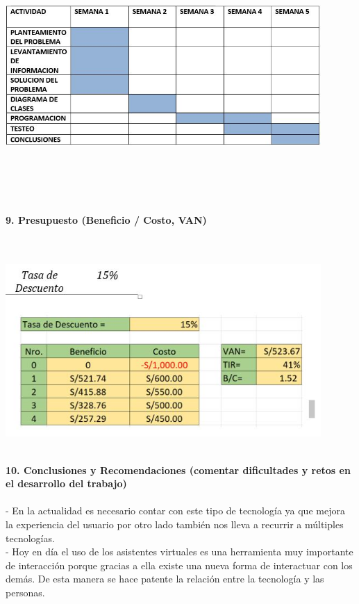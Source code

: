 \begin{flushleft}
\begin{itemize}
\textbf{ }\\
\begin{center}
	\includegraphics[width=12cm]{./Imagenes/bot1} 
	\end{center}
\textbf{ }\\
\textbf{ }\\
\textbf{ }\\
\textbf{ }\\
\textbf{9.      Presupuesto (Beneficio / Costo, VAN) }\\
\textbf{ }\\
\textbf{ }\\
\begin{center}
	\includegraphics[width=12cm]{./Imagenes/bot2} 
	\end{center}
\textbf{ }\\

\textbf{10.  Conclusiones y Recomendaciones (comentar dificultades y retos en el desarrollo del trabajo)}\\
\textbf{ }\\
-	En la actualidad es necesario contar con este tipo de tecnología ya que mejora la experiencia del usuario por otro lado también nos lleva a recurrir a múltiples tecnologías.\textbf{ }\\
-	Hoy en día el uso de los asistentes virtuales es una herramienta muy importante de interacción porque gracias a ella existe una nueva forma de interactuar con los demás. De esta manera se hace patente la relación entre la tecnología y las personas.\textbf{ }\\


\end{itemize} 


\end{flushleft}